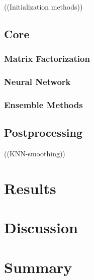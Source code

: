 \documentclass[10pt,conference,compsocconf]{IEEEtran}
\begin{document}
((Initialization methods))

\subsection{Core}
\subsubsection{Matrix Factorization}
\subsubsection{Neural Network}
\subsubsection{Ensemble Methods}

\subsection{Postprocessing}
((KNN-smoothing))

\section{Results}
\label{sec:results}


\section{Discussion}
\label{sec:discussion}

\section{Summary}




\end{document}

